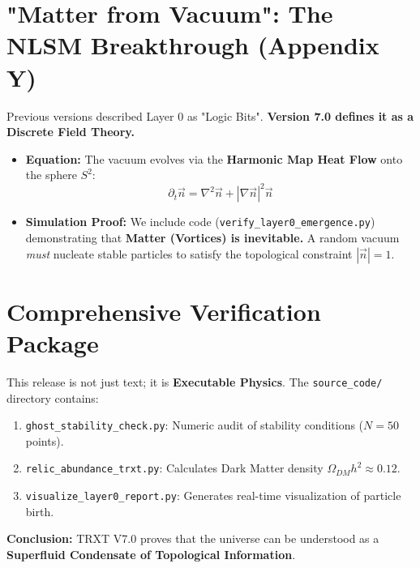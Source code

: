 \documentclass[11pt,a4paper]{article}
\begin{document}
\section{"Matter from Vacuum": The NLSM Breakthrough (Appendix Y)}

Previous versions described Layer 0 as "Logic Bits". \textbf{Version 7.0 defines it as a Discrete Field Theory.}

\begin{itemize}
    \item \textbf{Equation:} The vacuum evolves via the \textbf{Harmonic Map Heat Flow} onto the sphere $S^2$:
    \begin{equation}
        \partial_t \vec{n} = \nabla^2 \vec{n} + |\nabla \vec{n}|^2 \vec{n}
    \end{equation}
    
    \item \textbf{Simulation Proof:} We include code (\texttt{verify\_layer0\_emergence.py}) demonstrating that \textbf{Matter (Vortices) is inevitable.} A random vacuum \textit{must} nucleate stable particles to satisfy the topological constraint $|\vec{n}|=1$.
\end{itemize}

\section{Comprehensive Verification Package}

This release is not just text; it is \textbf{Executable Physics}. The \texttt{source\_code/} directory contains:

\begin{enumerate}
    \item \texttt{ghost\_stability\_check.py}: Numeric audit of stability conditions ($N=50$ points).
    \item \texttt{relic\_abundance\_trxt.py}: Calculates Dark Matter density $\Omega_{DM} h^2 \approx 0.12$.
    \item \texttt{visualize\_layer0\_report.py}: Generates real-time visualization of particle birth.
\end{enumerate}

\textbf{Conclusion:} TRXT V7.0 proves that the universe can be understood as a \textbf{Superfluid Condensate of Topological Information}.
\end{document}
